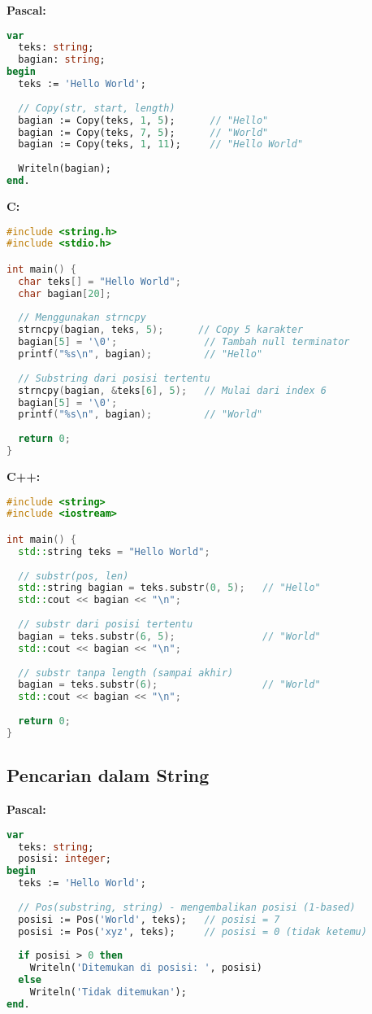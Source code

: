 \documentclass[../main.tex]{subfiles}
\begin{document}
\textbf{Pascal:}
\begin{lstlisting}[language=Pascal, caption={Substring di Pascal}]
var
  teks: string;
  bagian: string;
begin
  teks := 'Hello World';
  
  // Copy(str, start, length)
  bagian := Copy(teks, 1, 5);      // "Hello"
  bagian := Copy(teks, 7, 5);      // "World"
  bagian := Copy(teks, 1, 11);     // "Hello World"
  
  Writeln(bagian);
end.
\end{lstlisting}

\textbf{C:}
\begin{lstlisting}[language=C, caption={Substring di C}]
#include <string.h>
#include <stdio.h>

int main() {
  char teks[] = "Hello World";
  char bagian[20];
  
  // Menggunakan strncpy
  strncpy(bagian, teks, 5);      // Copy 5 karakter
  bagian[5] = '\0';               // Tambah null terminator
  printf("%s\n", bagian);         // "Hello"
  
  // Substring dari posisi tertentu
  strncpy(bagian, &teks[6], 5);   // Mulai dari index 6
  bagian[5] = '\0';
  printf("%s\n", bagian);         // "World"
  
  return 0;
}
\end{lstlisting}

\textbf{C++:}
\begin{lstlisting}[language=C++, caption={Substring di C++}]
#include <string>
#include <iostream>

int main() {
  std::string teks = "Hello World";
  
  // substr(pos, len)
  std::string bagian = teks.substr(0, 5);   // "Hello"
  std::cout << bagian << "\n";
  
  // substr dari posisi tertentu
  bagian = teks.substr(6, 5);               // "World"
  std::cout << bagian << "\n";
  
  // substr tanpa length (sampai akhir)
  bagian = teks.substr(6);                  // "World"
  std::cout << bagian << "\n";
  
  return 0;
}
\end{lstlisting}

\subsection{Pencarian dalam String}

\textbf{Pascal:}
\begin{lstlisting}[language=Pascal, caption={Pencarian di Pascal}]
var
  teks: string;
  posisi: integer;
begin
  teks := 'Hello World';
  
  // Pos(substring, string) - mengembalikan posisi (1-based)
  posisi := Pos('World', teks);   // posisi = 7
  posisi := Pos('xyz', teks);     // posisi = 0 (tidak ketemu)
  
  if posisi > 0 then
    Writeln('Ditemukan di posisi: ', posisi)
  else
    Writeln('Tidak ditemukan');
end.
\end{lstlisting}
\end{document}
